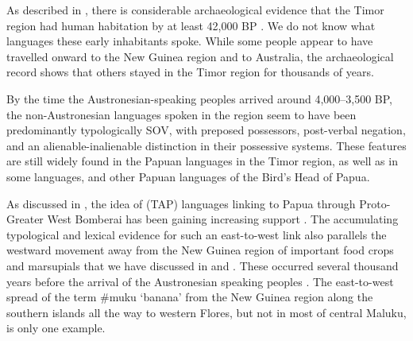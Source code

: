 As described in ,
there is considerable archaeological evidence that the Timor
region had human habitation by at least 42,000 BP \citep{OConnor2015}.
We do not know what languages these early inhabitants spoke.
While some people appear to have travelled onward to the New
Guinea region and to Australia, the archaeological record shows that others
stayed in the Timor region for thousands of years.

By the time the Austronesian-speaking peoples arrived around
4,000--3,500 BP, the non-Austronesian languages spoken in the region seem to have
been predominantly typologically SOV,
with preposed possessors, post-verbal negation,
and an alienable-inalienable distinction in their possessive systems.
These features are still widely found in the Papuan 
languages in the Timor region,
as well as in some  languages,
and other Papuan languages of
the Bird’s Head of Papua.

As discussed in ,
the idea of  (TAP) languages linking to
Papua through Proto-Greater West Bomberai has been gaining increasing
support \citep{UsherSchapper2022}.
The accumulating typological and lexical evidence for such an
east-to-west link also parallels the westward movement away from
the New Guinea region of important food crops
and marsupials that we have discussed in  and .
These occurred several thousand years before the arrival of the
Austronesian speaking peoples \citep{DenhamDonohue2009,DonohueDenham2009,
DonohueDenham2010,FlanneryNitihaminoto1995,Schapper2011}.
The east-to-west spread of the term {\#}muku ‘banana’ from the
New Guinea region along the southern islands all the way to western
Flores, but not in most of central Maluku,
is only one example.